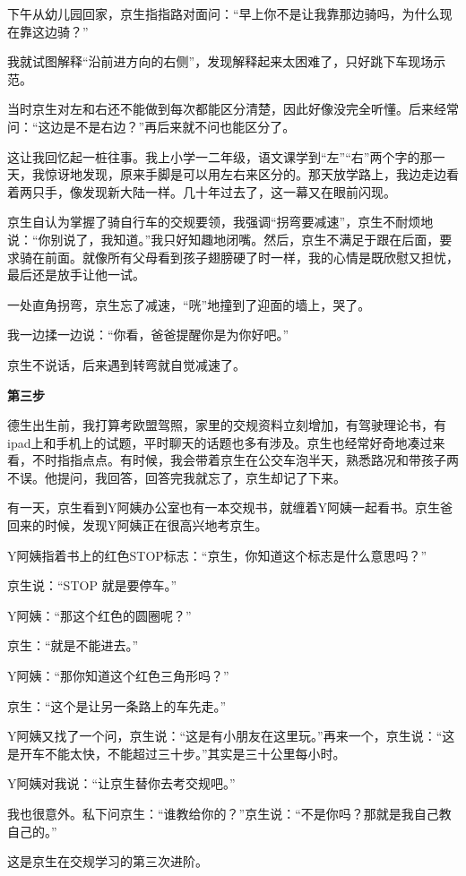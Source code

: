 \documentclass[twoside,openright,headings=optiontohead]{ctexbook} %
\begin{document}
{下午从幼儿园回家，京生指指路对面问：``早上你不是让我靠那边骑吗，为什么现在靠这边骑？''

我就试图解释``沿前进方向的右侧''，发现解释起来太困难了，只好跳下车现场示范。

当时京生对左和右还不能做到每次都能区分清楚，因此好像没完全听懂。后来经常问：``这边是不是右边？''再后来就不问也能区分了。

这让我回忆起一桩往事。我上小学一二年级，语文课学到``左''``右''两个字的那一天，我惊讶地发现，原来手脚是可以用左右来区分的。那天放学路上，我边走边看着两只手，像发现新大陆一样。几十年过去了，这一幕又在眼前闪现。

京生自认为掌握了骑自行车的交规要领，我强调``拐弯要减速''，京生不耐烦地说：``你别说了，我知道。''我只好知趣地闭嘴。然后，京生不满足于跟在后面，要求骑在前面。就像所有父母看到孩子翅膀硬了时一样，我的心情是既欣慰又担忧，最后还是放手让他一试。

一处直角拐弯，京生忘了减速，``咣''地撞到了迎面的墙上，哭了。

我一边揉一边说：``你看，爸爸提醒你是为你好吧。''

京生不说话，后来遇到转弯就自觉减速了。

\textbf{第三步}

德生出生前，我打算考欧盟驾照，家里的交规资料立刻增加，有驾驶理论书，有ipad上和手机上的试题，平时聊天的话题也多有涉及。京生也经常好奇地凑过来看，不时指指点点。有时候，我会带着京生在公交车泡半天，熟悉路况和带孩子两不误。他提问，我回答，回答完我就忘了，京生却记了下来。

有一天，京生看到Y阿姨办公室也有一本交规书，就缠着Y阿姨一起看书。京生爸回来的时候，发现Y阿姨正在很高兴地考京生。

Y阿姨指着书上的红色STOP标志：``京生，你知道这个标志是什么意思吗？''

京生说：``STOP 就是要停车。''

Y阿姨：``那这个红色的圆圈呢？''

京生：``就是不能进去。''

Y阿姨：``那你知道这个红色三角形吗？''

京生：``这个是让另一条路上的车先走。''

Y阿姨又找了一个问，京生说：``这是有小朋友在这里玩。''再来一个，京生说：``这是开车不能太快，不能超过三十步。''其实是三十公里每小时。

Y阿姨对我说：``让京生替你去考交规吧。''

我也很意外。私下问京生：``谁教给你的？''京生说：``不是你吗？那就是我自己教自己的。''

这是京生在交规学习的第三次进阶。

}
\end{document}
